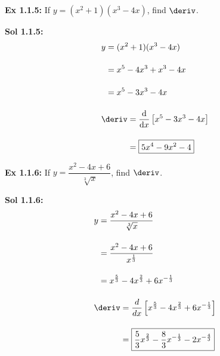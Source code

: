 \begin{tcolorbox}[example]
    \textbf{Ex 1.1.5: } If $y = (x^2 + 1)(x^3 - 4x)$, find $\deriv$. 
\end{tcolorbox}
\begin{tcolorbox}[solution]
    \textbf{Sol 1.1.5: } \begin{align*}
        & y \begin{aligned}[t]
            & = (x^2 + 1)(x^3 - 4x) \\[11pt]
            & = x^5 - 4x^3 + x^3 - 4x \\[11pt]
            & = x^5 - 3x^3 - 4x
        \end{aligned} \\[11pt]
        & \deriv \begin{aligned}[t]
            & = \frac{\mathrm{d}}{\mathrm{d}x}\left[x^5 - 3x^3 - 4x\right] \\[11pt]
            & = \boxed{5x^4 - 9x^2 - 4} \\
        \end{aligned}
    \end{align*} 
\end{tcolorbox} \vspace{11pt}

\begin{tcolorbox}[example]
    \textbf{Ex 1.1.6: } If $y = \dfrac{x^2 - 4x + 6}{\sqrt[3]{x}}$, find $\deriv$. 
\end{tcolorbox}
\begin{tcolorbox}[solution]
    \textbf{Sol 1.1.6: } \begin{align*}
        & y \begin{aligned}[t]
            & = \dfrac{x^2 - 4x + 6}{\sqrt[3]{x}} \\[11pt]
            & = \dfrac{x^2 - 4x + 6}{x^{\frac{1}{3}}} \\[11pt]
            & = x^{\frac{5}{3}} - 4x^{\frac{2}{3}} + 6x^{-\frac{1}{3}}
        \end{aligned} \\[11pt]
        & \deriv \begin{aligned}[t]
            & = \diff \left[x^{\frac{5}{3}} - 4x^{\frac{2}{3}} + 6x^{-\frac{1}{3}}\right] \\[11pt]
            & = \boxed{\dfrac{5}{3}x^{\frac{2}{3}} - \dfrac{8}{3}x^{-\frac{1}{3}} - 2x^{-\frac{4}{3}}}
        \end{aligned}
    \end{align*}
\end{tcolorbox}

